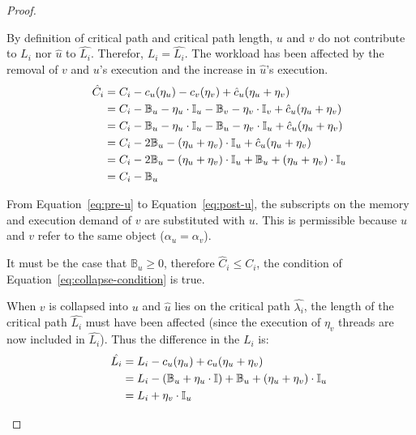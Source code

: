 \begin{theorem}
\begin{proof}
    \begin{case} By
      definition of critical path and critical path length, ${u}$ and
      ${v}$ do not contribute to ${L_i}$ nor ${\hat{u}}$ to
      ${\hat{L_i}}$. Therefor, ${L_i = \hat{L_i}}$. The
      workload has been affected by the removal of ${v}$ and ${u}$'s
      execution  and the increase in ${\hat{u}}$'s execution. 
      \begin{align}
        \indent
        \hat{C}_i &= C_i - c_u(\eta_u) - c_v(\eta_v) +
        \hat{c}_u(\eta_u + \eta_v) \\
        &= C_i - \mathbb{B}_u - \eta_u \cdot \mathbb{I}_u
            - \mathbb{B}_v - \eta_v \cdot \mathbb{I}_v +
            \hat{c}_u(\eta_u + \eta_v)
            \label{eq:pre-u} \\
        &= C_i - \mathbb{B}_u - \eta_u \cdot \mathbb{I}_u
            - \mathbb{B}_u - \eta_v \cdot \mathbb{I}_u +
            \hat{c}_u(\eta_u + \eta_v)
            \label{eq:post-u} \\
        &= C_i -2\mathbb{B}_u - (\eta_u + \eta_v)\cdot \mathbb{I}_u +
            \hat{c}_u(\eta_u + \eta_v) \\
        &= C_i -2\mathbb{B}_u - (\eta_u + \eta_v)\cdot \mathbb{I}_u +
            \mathbb{B}_u + (\eta_u + \eta_v)\cdot \mathbb{I}_u \\
        &= C_i - \mathbb{B}_u
      \end{align}

      From Equation~\ref{eq:pre-u} to Equation~\ref{eq:post-u}, the
      subscripts on the memory and execution demand of ${v}$ are
      substituted with ${u}$. This is permissible because ${u}$ and
      ${v}$ refer to the same object (${\alpha_u = \alpha_v}$).

      It must be the case that ${\mathbb{B}_u \ge 0}$, therefore
      ${\hat{C}_i \le C_i}$, the condition of
      Equation~\ref{eq:collapse-condition} is true.
    \end{case}

    \begin{case} When ${v}$ is
      collapsed into ${u}$ and ${\hat{u}}$ lies on the critical path
      ${\hat{\lambda_i}}$, the length of the critical path
      ${\hat{L_i}}$ must have been affected (since the
      execution of ${\eta_v}$ threads are now included in
      ${\hat{L_i}}$). Thus the difference in the ${L_i}$ is:
      \begin{align*}
        \indent
        \hat{L_i} &= L_i - c_u(\eta_u) + c_u(\eta_u + \eta_v) \\
        &= L_i - (\mathbb{B}_u + \eta_u \cdot \mathbb{I}) +
            \mathbb{B}_u + (\eta_u + \eta_v) \cdot \mathbb{I}_u \\
        &= L_i + \eta_v \cdot \mathbb{I}_u
      \end{align*}



\end{case}
\end{proof}
\end{theorem}

